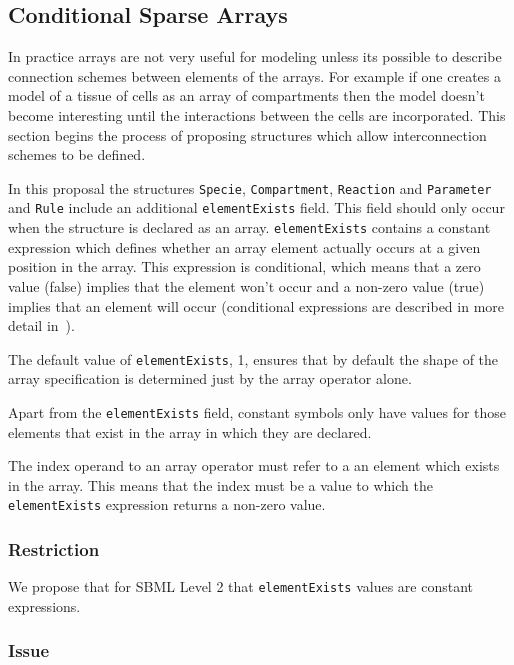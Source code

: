 \documentclass{cekarticle}
\begin{document}
\subsection{Conditional Sparse Arrays}

In practice arrays are not very useful for modeling unless its
possible to describe connection schemes between elements of the
arrays.  For example if one creates a model of a tissue of cells
as an array of compartments then the model doesn't become
interesting until the interactions between the cells are
incorporated.  This section begins the process of proposing
structures which allow interconnection schemes to be defined.

In this proposal the structures \texttt{Specie},
\texttt{Compartment}, \texttt{Reaction} and \texttt{Parameter} and
\texttt{Rule} include an additional \texttt{elementExists}
field.  This field should only occur when the structure is
declared as an array.  \texttt{elementExists} contains a constant
expression which defines whether an array element actually occurs
at a given position in the array.  This expression is
conditional, which means that a zero value (false) implies that
the element won't occur and a non-zero value (true) implies that
an element will occur (conditional expressions are described in
more detail in~\citet{finney:2002c}).

The default value of \texttt{elementExists}, 1, ensures that by
default the shape of the array specification is determined just
by the array operator alone.

Apart from the \texttt{elementExists} field, constant
symbols only have values for those elements that exist in the
array in which they are declared.

The index operand to an array operator must refer to a an element
which exists in the array.  This means that the index must be a
value to which the \texttt{elementExists} expression returns a
non-zero value.

\subsubsection{Restriction}

We propose that for SBML Level 2 that \texttt{elementExists}
values are constant expressions.

\subsubsection{Issue}
\end{document}
